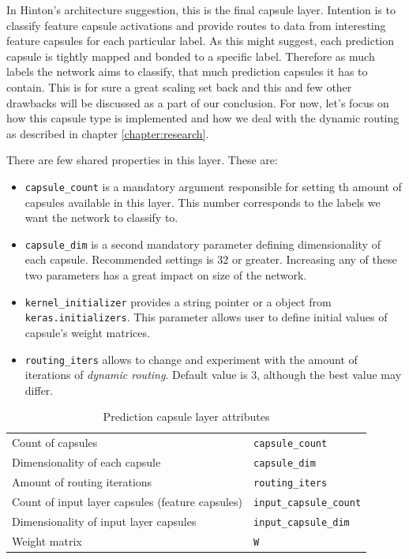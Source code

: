 In Hinton's \cite{capsule} architecture suggestion, this is the final capsule layer. Intention is to classify feature capsule activations and provide routes to data from interesting feature capsules
for each particular label. As this might suggest, each prediction capsule is tightly mapped and bonded to a specific label. Therefore as much labels the network aims to classify, that much prediction capsules it has to contain. This is for sure a great scaling set back and this and few other drawbacks will be discussed as a part of our conclusion. For now, let's focus on how this capsule type is implemented and how we deal with the dynamic routing as described in chapter \ref{chapter:research}.

There are few shared properties in this layer. These are:

\begin{itemize}
    \item \texttt{capsule\_count} is a mandatory argument responsible for setting th amount of capsules available in this layer. This number corresponds to the labels we want the network to classify to.
    \item \texttt{capsule\_dim} is a second mandatory parameter defining dimensionality of each capsule. Recommended settings is 32 or greater. Increasing any of these two parameters has a great impact on size of the network.
    \item \texttt{kernel\_initializer} provides a string pointer or a object from \texttt{keras.initializers}. This parameter allows user to define initial values of capsule's weight matrices.
    \item \texttt{routing\_iters} allows to change and experiment with the amount of iterations of \textit{dynamic routing}. Default value is 3, although the best value may differ.
\end{itemize}

\begin{table}[ht]
    \centering
    \begin{tabularx}{.8\textwidth}{l|X}
        \toprule
        Count of capsules & \texttt{capsule\_count} \\
        Dimensionality of each capsule & \texttt{capsule\_dim} \\
        Amount of routing iterations & \texttt{routing\_iters} \\
        Count of input layer capsules (feature capsules) & \texttt{input\_capsule\_count} \\
        Dimensionality of input layer capsules & \texttt{input\_capsule\_dim} \\
        Weight matrix & \texttt{W} \\
        \bottomrule
    \end{tabularx}
    \caption{Prediction capsule layer attributes}
\end{table}


